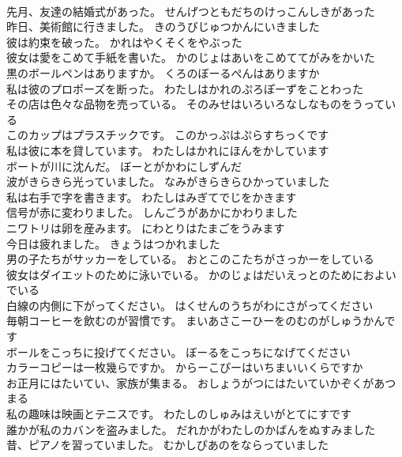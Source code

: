 \documentclass[8pt]{extreport}
\begin{document}
\begin{CJK}{UTF8}{min}
\\	先月、友達の結婚式があった。	せんげつともだちのけっこんしきがあった 
\\	昨日、美術館に行きました。	きのうびじゅつかんにいきました 
\\	彼は約束を破った。	かれはやくそくをやぶった 
\\	彼女は愛をこめて手紙を書いた。	かのじょはあいをこめててがみをかいた 
\\	黒のボールペンはありますか。	くろのぼーるぺんはありますか 
\\	私は彼のプロポーズを断った。	わたしはかれのぷろぽーずをことわった 
\\	その店は色々な品物を売っている。	そのみせはいろいろなしなものをうっている 
\\	このカップはプラスチックです。	このかっぷはぷらすちっくです 
\\	私は彼に本を貸しています。	わたしはかれにほんをかしています 
\\	ボートが川に沈んだ。	ぼーとがかわにしずんだ 
\\	波がきらきら光っていました。	なみがきらきらひかっていました 
\\	私は右手で字を書きます。	わたしはみぎてでじをかきます 
\\	信号が赤に変わりました。	しんごうがあかにかわりました 
\\	ニワトリは卵を産みます。	にわとりはたまごをうみます 
\\	今日は疲れました。	きょうはつかれました 
\\	男の子たちがサッカーをしている。	おとこのこたちがさっかーをしている 
\\	彼女はダイエットのために泳いでいる。	かのじょはだいえっとのためにおよいでいる 
\\	白線の内側に下がってください。	はくせんのうちがわにさがってください 
\\	毎朝コーヒーを飲むのが習慣です。	まいあさこーひーをのむのがしゅうかんです 
\\	ボールをこっちに投げてください。	ぼーるをこっちになげてください 
\\	カラーコピーは一枚幾らですか。	からーこぴーはいちまいいくらですか 
\\	お正月にはたいてい、家族が集まる。	おしょうがつにはたいていかぞくがあつまる 
\\	私の趣味は映画とテニスです。	わたしのしゅみはえいがとてにすです 
\\	誰かが私のカバンを盗みました。	だれかがわたしのかばんをぬすみました 
\\	昔、ピアノを習っていました。	むかしぴあのをならっていました 

\end{CJK}
\end{document}
